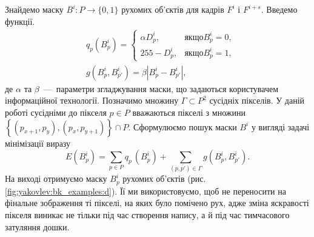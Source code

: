 Знайдемо маску $B^{i}:P \rightarrow \{0,1\}$ рухомих
об'єктів для кадрів \(F^{i}\) і \(F^{i + s}\).
Введемо функції.
\begin{align*}
    &q_{p}(B_{p}^{i}) =
      \begin{cases}
        \alpha D_{p}^{i}, & \textit{якщо} B_{p}^{i} = 0, \\
        255 - D_{p}^{i},  & \textit{якщо} B_{p}^{i} = 1 ,
      \end{cases} \\
    &g(B_{p}^{i},B_{p'}^{i}) = \beta|B_{p}^{i} - B_{p'}^{i}|,
\end{align*}
де \(\alpha\) та \(\beta\)~---~параметри згладжування маски, що задаються
користувачем інформаційної технології. Позначимо множину
$\Gamma \subset P^{2}$ сусідніх пікселів. У даній роботі сусідніми до
пікселя \(p \in P\) вважаються пікселі з множини
\(\left\{ \left( p_{x + 1},p_{y} \right),\left( p_{x},p_{y + 1} \right) \right\} \cap P\).
Сформулюємо пошук маски \(B^{i}\) у вигляді задачі мінімізації виразу
\begin{equation*}
    E\left( B_{p}^{i} \right) = \sum_{p \in P}^{}{q_{{p\ }}( B_{p}^{i}) +}\sum_{(p,p') \in \Gamma}^{}g(B_{p}^{i},B_{p'}^{i}).
\end{equation*}
На виході отримуємо маску \(B_{p}^{i}\) рухомих об'єктів (рис.
\ref{fig:yakovlev:bk_examples:d}).
Її ми використовуємо, щоб не переносити на фінальне зображення ті
пікселі, на яких було помічено рух, адже зміна яскравості пікселя
виникає не тільки під час створення напису, а й під час тимчасового
затуляння дошки.
